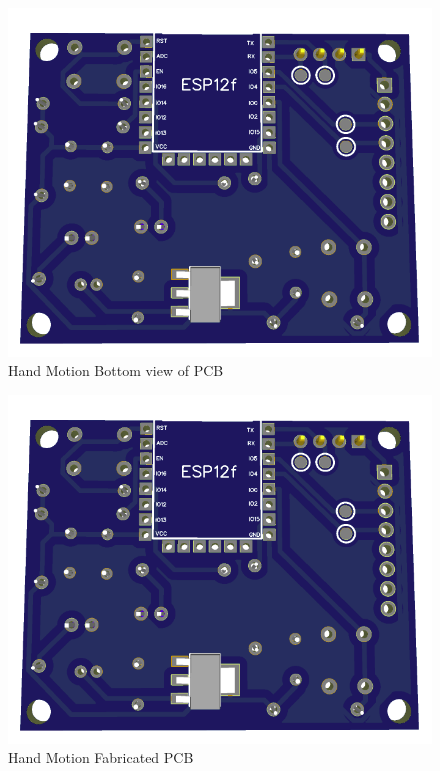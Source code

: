 \begin{figure}[H]
    \centering
    \includegraphics[scale=0.5]{Figures/HMpcb_bottom.png}
    \caption{Hand Motion Bottom view of PCB}
    \label{fig:handmotionbottomview}
\end{figure}


\begin{figure}[H]
    \centering
    \includegraphics[scale=0.5]{Figures/HMpcb_bottom.png}
    \caption{Hand Motion Fabricated PCB}
    \label{fig:handmotionfabricatedpcb}
\end{figure}

